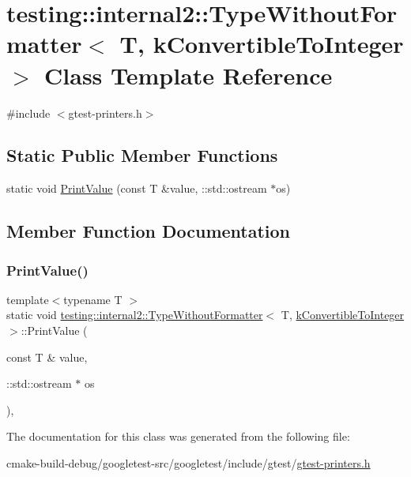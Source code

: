\hypertarget{classtesting_1_1internal2_1_1TypeWithoutFormatter_3_01T_00_01kConvertibleToInteger_01_4}{}\section{testing\+::internal2\+::Type\+Without\+Formatter$<$ T, k\+Convertible\+To\+Integer $>$ Class Template Reference}
\label{classtesting_1_1internal2_1_1TypeWithoutFormatter_3_01T_00_01kConvertibleToInteger_01_4}


{\ttfamily \#include $<$gtest-\/printers.\+h$>$}

\subsection*{Static Public Member Functions}
\begin{DoxyCompactItemize}
\item 
static void \mbox{\hyperlink{classtesting_1_1internal2_1_1TypeWithoutFormatter_3_01T_00_01kConvertibleToInteger_01_4_ab27a411afb608e730a57d232b3f4f486}{Print\+Value}} (const T \&value, \+::std\+::ostream $\ast$os)
\end{DoxyCompactItemize}


\subsection{Member Function Documentation}
\mbox{\label{classtesting_1_1internal2_1_1TypeWithoutFormatter_3_01T_00_01kConvertibleToInteger_01_4_ab27a411afb608e730a57d232b3f4f486}} 
\subsubsection{\texorpdfstring{PrintValue()}{PrintValue()}}
{\footnotesize\ttfamily template$<$typename T $>$ \\
static void \mbox{\hyperlink{classtesting_1_1internal2_1_1TypeWithoutFormatter}{testing\+::internal2\+::\+Type\+Without\+Formatter}}$<$ T, \mbox{\hyperlink{namespacetesting_1_1internal2_aeb8161b0b3ee503347b0662d7028fd57a9bdcf3f1548f498b2b7f097306ea0224}{k\+Convertible\+To\+Integer}} $>$\+::Print\+Value (\begin{DoxyParamCaption}\item[{const T \&}]{value,  }\item[{\+::std\+::ostream $\ast$}]{os }\end{DoxyParamCaption})\hspace{0.3cm}{\ttfamily [inline]}, {\ttfamily [static]}}



The documentation for this class was generated from the following file\+:\begin{DoxyCompactItemize}
\item 
cmake-\/build-\/debug/googletest-\/src/googletest/include/gtest/\mbox{\hyperlink{gtest-printers_8h}{gtest-\/printers.\+h}}\end{DoxyCompactItemize}
